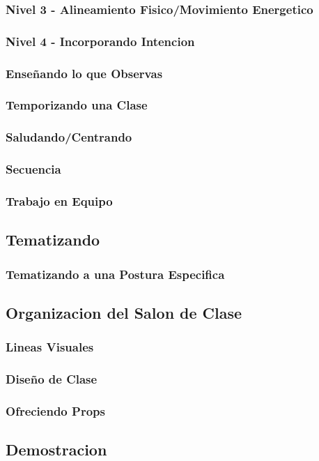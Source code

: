 \documentclass[a4paper]{article}
\begin{document}
\subsubsection{Nivel 3 - Alineamiento Fisico/Movimiento Energetico}
\subsubsection{Nivel 4 - Incorporando Intencion}
\subsubsection{Enseñando lo que Observas}
\subsubsection{Temporizando una Clase}
\subsubsection{Saludando/Centrando}
\subsubsection{Secuencia}
\subsubsection{Trabajo en Equipo}
\subsection{Tematizando}
\subsubsection{Tematizando a una Postura Especifica}
\subsection{Organizacion del Salon de Clase}
\subsubsection{Lineas Visuales}
\subsubsection{Diseño de Clase}
\subsubsection{Ofreciendo Props}
\subsection{Demostracion}
\end{document}
